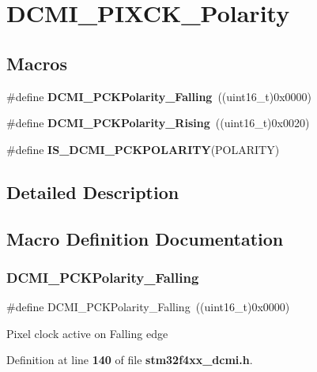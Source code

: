 \section{D\+C\+M\+I\+\_\+\+P\+I\+X\+C\+K\+\_\+\+Polarity}
\label{group__DCMI__PIXCK__Polarity}
\subsection*{Macros}
\begin{DoxyCompactItemize}
\item 
\#define \textbf{ D\+C\+M\+I\+\_\+\+P\+C\+K\+Polarity\+\_\+\+Falling}~((uint16\+\_\+t)0x0000)
\item 
\#define \textbf{ D\+C\+M\+I\+\_\+\+P\+C\+K\+Polarity\+\_\+\+Rising}~((uint16\+\_\+t)0x0020)
\item 
\#define \textbf{ I\+S\+\_\+\+D\+C\+M\+I\+\_\+\+P\+C\+K\+P\+O\+L\+A\+R\+I\+TY}(P\+O\+L\+A\+R\+I\+TY)
\end{DoxyCompactItemize}


\subsection{Detailed Description}


\subsection{Macro Definition Documentation}
\mbox{\label{group__DCMI__PIXCK__Polarity_ga71fe5ad550cc63a754ea075d7b21fd78}} 
\subsubsection{D\+C\+M\+I\+\_\+\+P\+C\+K\+Polarity\+\_\+\+Falling}
{\footnotesize\ttfamily \#define D\+C\+M\+I\+\_\+\+P\+C\+K\+Polarity\+\_\+\+Falling~((uint16\+\_\+t)0x0000)}

Pixel clock active on Falling edge 

Definition at line \textbf{ 140} of file \textbf{ stm32f4xx\+\_\+dcmi.\+h}.

